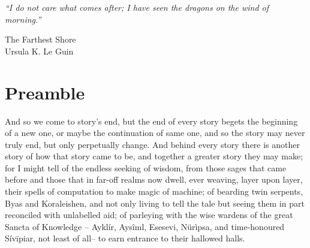 \epigraph{
    \emph{
        ``I do not care what comes after; I have seen the dragons on the wind of morning.''
} 
%
}
{The Farthest Shore\\Ursula K. Le Guin}
%
\section*{Preamble}
%
And so we come to story's end, but the end of every story begets the beginning of a new one, or
maybe the continuation of same one, and so the story may never truly end, but only perpetually
change.
%
And behind every story there is another story of how that story came to be, and together a greater
story they may make;
%
for I might tell of the endless seeking of wisdom, from those sages that came before and those that
in far-off realms now dwell, ever weaving, layer upon layer, their spells of computation to make
magic of machine;
%
of bearding twin serpents, Byas and Koraleishen, and not only living to tell the tale but seeing
them in part reconciled with unlabelled aid;
%
of parleying with the wise wardens of the great Sancta of Knowledge -- Aykl\'ir, Ays\^iml, Esesevi,
N\"ur\`ipsa, and time-honoured S\'iv\={i}piar, not least of all-- to earn entrance to their
hallowed halls.
%
